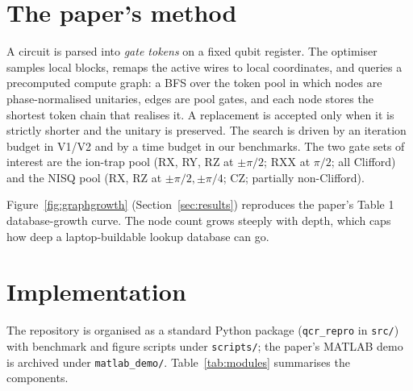 \documentclass[11pt,a4paper]{article}
\begin{document}
\section{The paper's method}
\label{sec:method}
A circuit is parsed into \emph{gate tokens} on a fixed qubit register. The
optimiser samples local blocks, remaps the active wires to local coordinates,
and queries a precomputed compute graph: a BFS over the token pool in which
nodes are phase-normalised unitaries, edges are pool gates, and each node
stores the shortest token chain that realises it. A replacement is accepted
only when it is strictly shorter and the unitary is preserved. The search is
driven by an iteration budget in V1/V2 and by a time budget in our benchmarks.
The two gate sets of interest are the ion-trap pool (RX, RY, RZ at
$\pm\pi/2$; RXX at $\pi/2$; all Clifford) and the NISQ pool (RX, RZ at
$\pm\pi/2,\pm\pi/4$; CZ; partially non-Clifford).

Figure~\ref{fig:graphgrowth} (Section~\ref{sec:results}) reproduces the
paper's Table 1 database-growth curve. The node count grows steeply with
depth, which caps how deep a laptop-buildable lookup database can go.

\section{Implementation}
\label{sec:implementation}
The repository is organised as a standard Python package
(\texttt{qcr\_repro} in \texttt{src/}) with benchmark and figure scripts under
\texttt{scripts/}; the paper's MATLAB demo is archived under
\texttt{matlab\_demo/}. Table~\ref{tab:modules} summarises the components.
\end{document}
